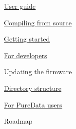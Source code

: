 
\begin{DoxyItemize}
\item \hyperlink{axo_gui}{User guide}
\item \hyperlink{compile}{Compiling from source}
\item \hyperlink{getting_started}{Getting started} 
\item \hyperlink{developers}{For developers}
\item \hyperlink{updating_firmware}{Updating the firmware}
\item \hyperlink{directory_structure}{Directory structure}
\item \hyperlink{pd_user}{For Pure\+Data users} 
\item Roadmap 
\end{DoxyItemize}